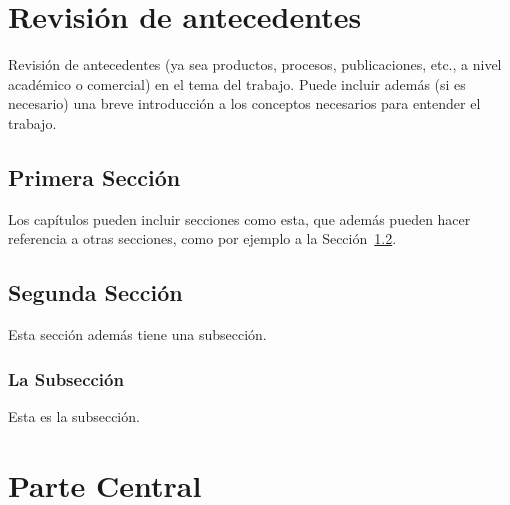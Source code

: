 \documentclass{prgrado}
\begin{document}
\chapter{Revisión de antecedentes} 

Revisión de antecedentes (ya sea productos, procesos, publicaciones, etc., a nivel académico o comercial) en el tema del trabajo. Puede incluir además (si es necesario) una breve introducción a los conceptos necesarios para entender el trabajo.

\section{Primera Sección}

Los capítulos pueden incluir secciones como esta, que además pueden hacer referencia a otras secciones, como por ejemplo a la Sección~\ref{sec:segunda}.


\section{Segunda Sección}\label{sec:segunda}

Esta sección además tiene una subsección.

\subsection{La Subsección}

Esta es la subsección.


\chapter{Parte Central}

\end{document}
